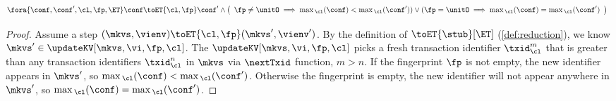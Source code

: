 \begin{lemma}
\label{lem:kv-max-cl}
\[
\begin{array}{@{}l}
    \fora{\conf, \conf' ,\cl, \fp, \ET}
    \conf \toET{\cl, \fp}  \conf' 
    \land 
    \left( 
        \begin{array}{l}
        \fp \neq \unitO \implies \max{}_\cl(\conf) < \max{}_\cl(\conf') )
        \lor ( \fp = \unitO \implies \max{}_\cl(\conf) = \max{}_\cl(\conf')
        \end{array}
    \right)
\end{array}
\]
\end{lemma}
\begin{proof}
    Assume a step \( (\mkvs, \vienv) \toET{\cl, \fp} (\mkvs', \vienv') \).
    By the definition of \( \toET{\stub}[\ET]\) (\cref{def:reduction}), we know \( \mkvs' \in \updateKV[\mkvs, \vi, \fp, \cl] \).
    The \( \updateKV[\mkvs, \vi, \fp, \cl] \) picks a fresh transaction identifier \( \txid_\cl^{m} \) that is greater than any transaction identifiers \( \txid_\cl^{n} \) in \( \mkvs \) via \( \nextTxid \) function, \ie \( m > n \).
    If the fingerprint \( \fp \) is not empty, the new identifier appears in \( \mkvs' \), so \( \max{}_\cl(\conf) < \max{}_\cl(\conf') \).
    Otherwise  the fingerprint is empty, the new identifier will not appear anywhere in \( \mkvs' \), so \( \max{}_\cl(\conf) = \max{}_\cl(\conf') \). 
\end{proof}

